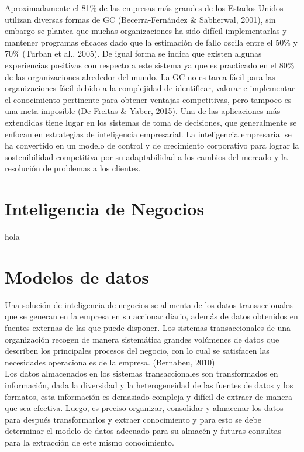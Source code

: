 Aproximadamente el 81\% de las empresas más grandes de los Estados Unidos utilizan diversas formas de GC (Becerra-Fernández \& Sabherwal, 2001), sin embargo se plantea que muchas organizaciones ha sido difícil implementarlas y mantener programas eficaces dado que la estimación de fallo oscila entre el 50\% y 70\% (Turban et al., 2005). De igual forma se indica que existen algunas experiencias positivas con respecto a este sistema ya que es practicado en el 80\% de las organizaciones alrededor del mundo. La GC no es tarea fácil para las organizaciones fácil debido a la complejidad de identificar, valorar e implementar el conocimiento pertinente para obtener ventajas competitivas, pero tampoco es una meta imposible (De Freitas \& Yaber, 2015). Una de las aplicaciones más extendidas tiene lugar en los sistemas de toma de decisiones, que generalmente se enfocan en estrategias de inteligencia empresarial. La inteligencia empresarial se ha convertido en un modelo de control y de crecimiento corporativo para lograr la sostenibilidad competitiva por su adaptabilidad a los cambios del mercado y la resolución de problemas a los clientes.

\section*{Inteligencia de Negocios}\label{BI}
hola

\section*{Modelos de datos}\label{models}
Una solución de inteligencia de negocios se alimenta de los datos transaccionales que se generan en la empresa en su accionar diario, además de datos obtenidos en fuentes externas de las que puede disponer. Los sistemas transaccionales de una organización recogen de manera sistemática grandes volúmenes de datos que describen los principales procesos del negocio, con lo cual se satisfacen las necesidades operacionales de la empresa. (Bernabeu, 2010)\\

Los datos almacenados en los sistemas transaccionales son transformados en información, dada la diversidad y la heterogeneidad de las fuentes de datos y los formatos, esta información es demasiado compleja y difícil de extraer de manera que sea efectiva. Luego, es preciso organizar, consolidar y almacenar los datos para después transformarlos y extraer conocimiento y para esto se debe determinar el modelo de datos adecuado para su almacén y futuras consultas para la extracción de este mismo conocimiento.

